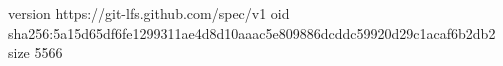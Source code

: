 version https://git-lfs.github.com/spec/v1
oid sha256:5a15d65df6fe1299311ae4d8d10aaac5e809886dcddc59920d29c1acaf6b2db2
size 5566
